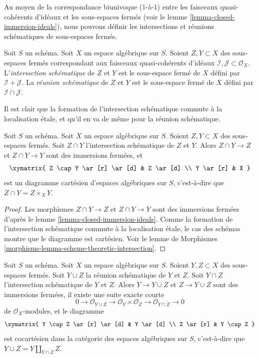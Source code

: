 \noindent
Au moyen de la correspondance biunivoque ($1$-à-$1$) entre les faisceaux quasi-cohérents
d'idéaux et les sous-espaces fermés (voir le
lemme \ref{lemma-closed-immersion-ideals}),
nous pouvons définir les intersections et réunions schématiques
de sous-espaces fermés.

\begin{definition}
\label{definition-scheme-theoretic-intersection-union}
Soit $S$ un schéma. Soit $X$ un espace algébrique sur $S$.
Soient $Z, Y \subset X$ des sous-espaces fermés
correspondant aux faisceaux quasi-cohérents d'idéaux
$\mathcal{I}, \mathcal{J} \subset \mathcal{O}_X$.
L'{\it intersection schématique} de $Z$ et $Y$
est le sous-espace fermé de $X$ défini par $\mathcal{I} + \mathcal{J}$.
La {\it réunion schématique} de $Z$ et $Y$
est le sous-espace fermé de $X$ défini par
$\mathcal{I} \cap \mathcal{J}$.
\end{definition}

\noindent
Il est clair que la formation de l'intersection schématique
commute à la localisation étale, et qu'il en va de même pour la
réunion schématique.

\begin{lemma}
\label{lemma-scheme-theoretic-intersection}
Soit $S$ un schéma. Soit $X$ un espace algébrique sur $S$.
Soient $Z, Y \subset X$ des sous-espaces fermés.
Soit $Z \cap Y$ l'intersection schématique de $Z$ et $Y$.
Alors $Z \cap Y \to Z$ et $Z \cap Y \to Y$ sont des immersions fermées,
et
$$
\xymatrix{
Z \cap Y \ar[r] \ar[d] & Z \ar[d] \\
Y \ar[r] & X
}
$$
est un diagramme cartésien d'espaces algébriques sur $S$, c'est-à-dire que
$Z \cap Y = Z \times_X Y$.
\end{lemma}

\begin{proof}
Les morphismes $Z \cap Y \to Z$ et $Z \cap Y \to Y$ sont des immersions fermées
d'après le lemme \ref{lemma-closed-immersion-ideals}.
Comme la formation de l'intersection schématique commute
à la localisation étale, le cas des schémas montre que le diagramme est cartésien.
Voir le
lemme de Morphismes \ref{morphisms-lemma-scheme-theoretic-intersection}.
\end{proof}

\begin{lemma}
\label{lemma-scheme-theoretic-union}
Soit $S$ un schéma. Soit $X$ un espace algébrique sur $S$.
Soient $Y, Z \subset X$ des sous-espaces fermés.
Soit $Y \cup Z$ la réunion schématique de $Y$ et $Z$.
Soit $Y \cap Z$ l'intersection schématique de $Y$ et $Z$.
Alors $Y \to Y \cup Z$ et $Z \to Y \cup Z$ sont des immersions fermées,
il existe une suite exacte courte
$$
0 \to \mathcal{O}_{Y \cup Z} \to \mathcal{O}_Y \times \mathcal{O}_Z
\to \mathcal{O}_{Y \cap Z} \to 0
$$
de $\mathcal{O}_X$-modules, et le diagramme
$$
\xymatrix{
Y \cap Z \ar[r] \ar[d] & Y \ar[d] \\
Z \ar[r] & Y \cup Z
}
$$
est cocartésien dans la catégorie des espaces algébriques sur $S$, c'est-à-dire que
$Y \cup Z = Y \amalg_{Y \cap Z} Z$.
\end{lemma}

